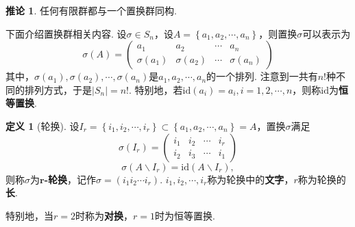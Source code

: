 \documentclass[12pt]{ctexart}
\theoremstyle{definition}
\newtheorem{definition}{定义}[section]
\newtheorem{corollary}{推论}[section]
\theoremstyle{plain}
\newcommand{\id}{\mathrm{id}}
\begin{document}
\begin{corollary}
	任何有限群都与一个置换群同构.
\end{corollary}
下面介绍置换群相关内容. 设$\sigma\in S_n$，设$A=\left\{a_1,a_2,\cdots,a_n\right\}$，则置换$\sigma$可以表示为
$$\sigma(A)=
\begin{pmatrix}
	a_1 & a_2 & \cdots & a_n \\
	\sigma(a_1) & \sigma(a_2) & \cdots & \sigma(a_n)
\end{pmatrix}
$$
其中，$\sigma(a_1),\sigma(a_2),\cdots,\sigma(a_n)$是$a_1,a_2,\cdots,a_n$的一个排列. 注意到一共有$n!$种不同的排列方式，于是$|S_n|=n!$. 特别地，若$\id(a_i)=a_i,i=1,2,\cdots,n$，则称$\id$为\textbf{恒等置换}.
\begin{definition}[轮换]
	设$I_r=\left\{i_1,i_2,\cdots,i_r\right\}\subset\left\{a_1,a_2,\cdots,a_n\right\}=A$，置换$\sigma$满足
	$$\sigma(I_r)=
	\begin{pmatrix}
		i_1 & i_2 & \cdots & i_r \\
		i_2 & i_3 & \cdots & i_1
	\end{pmatrix}
	$$
	$$\sigma(A\backslash I_r)=\id(A\backslash I_r),$$
	则称$\sigma$为$\boldsymbol{r}$\textbf{-轮换}，记作$\sigma=(i_1i_2\cdots i_r)$. $i_1,i_2,\cdots,i_r$称为轮换中的\textbf{文字}，$r$称为轮换的\textbf{长}.
\end{definition}
特别地，当$r=2$时称为\textbf{对换}，$r=1$时为恒等置换.
\end{document}
